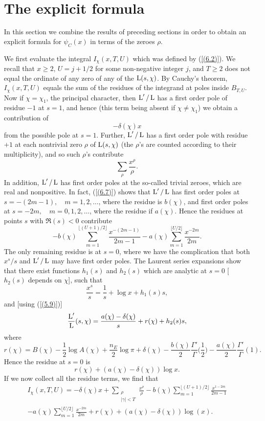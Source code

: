 \documentclass[./main]{subfiles}
\begin{document}
\section{The explicit formula}
In this section we combine the results of preceding sections in order to obtain an explicit formula for $\psi_C(x)$ in terms of the zeroes $\rho$. 

We first evaluate the integral $I_{\chi}(x,T,U)$ which was defined by (\ref{(6.2)}). We recall that $x \geq 2$, $U = j + 1/2$ for some non-negative integer $j$, and $T \geq 2$ does not equal the ordinate of any zero of any of the $\operatorname{L}(s, \chi)$. By Cauchy's theorem, $I_{\chi}(x,T,U)$ equals the sum of the residues of the integrand at poles inside $B_{T,U}$. Now if $\chi = \chi_1$, the principal character, then $\operatorname{L}'/\operatorname{L}$ has a first order pole of residue $-1$ at $s=1$, and hence (this term being absent if $\chi \neq \chi_1$) we obtain a contribution of 
\[ -\delta(\chi)x
\]
from the possible pole at $s=1$. Further, $\operatorname{L}'/\operatorname{L}$ has a first order pole with residue $+1$ at each nontrivial zero $\rho$ of $\operatorname{L}(s, \chi)$ (the $\rho$'s are counted according to their multiplicity), and so such $\rho$'s contribute
\[ \sum_{\rho} \frac{x^{\rho}}{\rho}.
\]
In addition, $\operatorname{L}'/\operatorname{L}$ has first order poles at the so-called trivial zeroes, which are real and nonpositive. In fact, (\ref{(6.7)}) shows that $\operatorname{L}'/\operatorname{L}$ has first order poles at $s = -(2m-1),\quad m=1,2,\dots$, where the residue is $b(\chi)$, and first order poles at $s=-2m,\quad m=0,1,2,\dots$, where the residue if $a(\chi)$. Hence the residues at points $s$ with $\Re(s) < 0$ contribute 
\[ -b(\chi) \sum_{m=1}^{\lfloor(U+1)/2\rfloor} \frac{x^{-(2m-1)}}{2m-1} - a(\chi) \sum_{m=1}^{\lfloor U/2\rfloor} \frac{x^{-2m}}{2m}.
\]
The only remaining residue is at $s=0$, where we have the complication that both $x^s/s$ and $\operatorname{L}'/\operatorname{L}$ may have first order poles. The Laurent series expansions show that there exist functions $h_1(s)$ and $h_2(s)$ which are analytic at $s=0$ [$h_2(s)$ depends on $\chi$], such that 
\[ \frac{x^s}{s} = \frac{1}{s} + \log x + h_1(s)s,
\]
and [using (\ref{(5.9)})]
\[ \frac{\operatorname{L}'}{\operatorname{L}}(s, \chi) = \frac{a(\chi) - \delta(\chi)}{s} + r(\chi) +  h_2(s)s,
\]
where 
\[\tag{7.1}\label{(7.1)} r(\chi) = B(\chi) - \frac{1}{2} \log A(\chi) + \frac{n_E}{2} \log\pi + \delta(\chi) - \frac{b(\chi)}{2}\frac{\Gamma'}{\Gamma}\Big(\frac{1}{2}\Big) - \frac{a(\chi)}{2}\frac{\Gamma'}{\Gamma}(1).\quad
\]
Hence the residue at $s=0$ is 
\[ r(\chi) + (a(\chi) - \delta(\chi)) \log x
.\]
If we now collect all the residue terms, we find that 
\begin{multline}\tag{7.2}\label{(7.2)} I_{\chi}(x,T,U) = - \delta(\chi)x + \sum_{\substack{\rho \\ |\gamma| < T}} \frac{x^{\rho}}{\rho} - b(\chi) \sum_{m=1}^{\lfloor (U+1)/2\rfloor} \frac{x^{1-2m}}{2m-1} \\- a(\chi) \sum_{m=1}^{\lfloor U/2\rfloor} \frac{x^{-2m}}{2m} + r(\chi) + (a(\chi) - \delta(\chi)) \log(x).
\end{multline}
\end{document}
